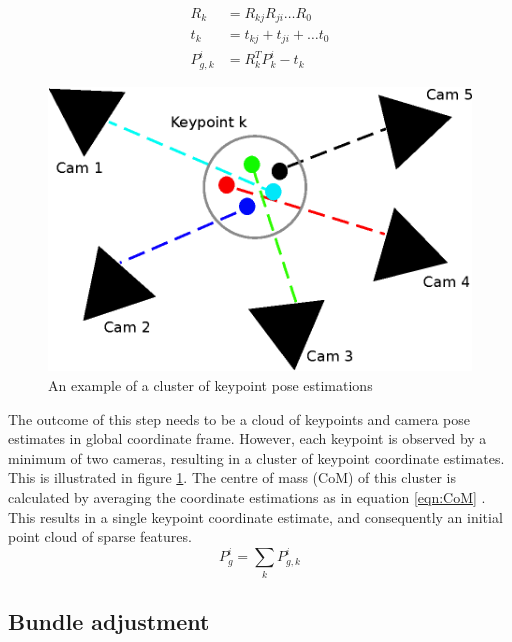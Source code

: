 \documentclass[10pt,twocolumn,letterpaper]{article}
\begin{document}
\begin{align}\label{eqn:globalpose}
R_{k} &= R_{kj}R_{ji}\ldots R_{0}\nonumber\\
t_{k} &= t_{kj}+t_{ji}+\ldots t_{0}\\
P^{i}_{g,k} &= R_{k}^T P^{i}_{k} - t_{k} \label{eqn:globalpoint}
\end{align}

\begin{figure}[t]
\begin{center}
   \includegraphics[width=0.9\linewidth]{figures/clusters.eps}
\end{center}
\caption{An example of a cluster of keypoint pose estimations}
\label{fig:clusters}
\end{figure}

The outcome of this step needs to be a cloud of keypoints and camera pose
estimates in global coordinate frame. However, each keypoint is observed by a
minimum of two cameras, resulting in a cluster of keypoint coordinate estimates.
This is illustrated in figure \ref{fig:clusters}.
The centre of mass (CoM) of this cluster is calculated by averaging the
coordinate estimations as in equation \ref{eqn:CoM} \cite{reckerdepth}. This results in a single keypoint coordinate estimate,
and consequently an initial point cloud of sparse features.
\begin{equation}\label{eqn:CoM}
P^{i}_{g} = \sum_{k}{P^{i}_{g,k}}
\end{equation}


\subsection{Bundle adjustment}
\end{document}
